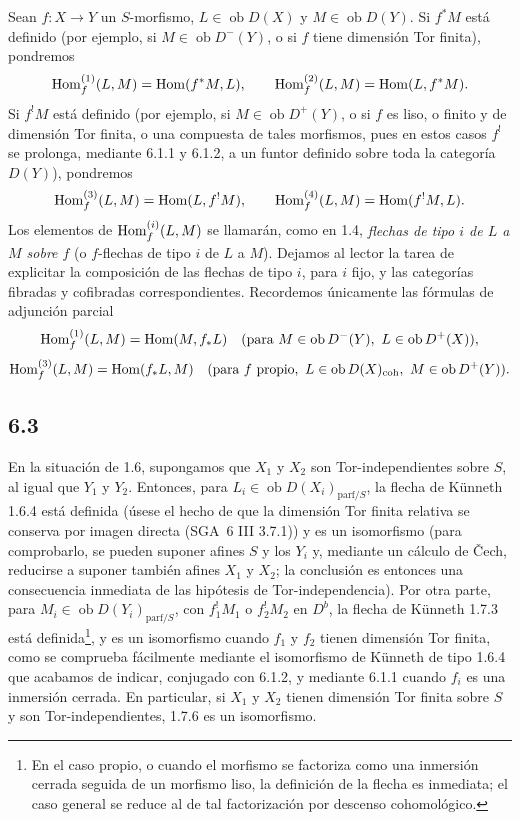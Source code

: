 Sean $f:X\to Y$ un $S$-morfismo, $L\in\operatorname{ob}D(X)$ y $M\in\operatorname{ob}D(Y)$. Si $f^*M$ está definido (por ejemplo, si $M\in\operatorname{ob}D^-(Y)$, o si $f$ tiene dimensión Tor finita), pondremos
\[
\operatorname{Hom}_f^{(1)}(L,M)=\operatorname{Hom}(f^*M,L),\qquad
\operatorname{Hom}_f^{(2)}(L,M)=\operatorname{Hom}(L,f^*M).
\]
Si $f^!M$ está definido (por ejemplo, si $M\in\operatorname{ob}D^+(Y)$, o si $f$ es liso, o finito y de dimensión Tor finita, o una compuesta de tales morfismos, pues en estos casos $f^!$ se prolonga, mediante 6.1.1 y 6.1.2, a un funtor definido sobre toda la categoría $D(Y)$), pondremos
\[
\operatorname{Hom}_f^{(3)}(L,M)=\operatorname{Hom}(L,f^!M),\qquad
\operatorname{Hom}_f^{(4)}(L,M)=\operatorname{Hom}(f^!M,L).
\]
Los elementos de $\operatorname{Hom}_f^{(i)}(L,M)$ se llamarán, como en 1.4, \emph{flechas de tipo $i$ de $L$ a $M$ sobre $f$} (o $f$-flechas de tipo $i$ de $L$ a $M$). Dejamos al lector la tarea de explicitar la composición de las flechas de tipo $i$, para $i$ fijo, y las categorías fibradas y cofibradas correspondientes. Recordemos únicamente las fórmulas de adjunción parcial
\[
\operatorname{Hom}_f^{(1)}(L,M)=\operatorname{Hom}(M,f_*L)\quad(\text{para }M\in\operatorname{ob}D^{-}(Y),\ L\in\operatorname{ob}D^+(X)),
\]
\[
\Hom_f^{(3)}(L,M)=\Hom(f_*L,M)\quad(\text{para }f\text{ propio},\ L\in\operatorname{ob}D(X)_{\mathrm{coh}},\ M\in\operatorname{ob}D^+(Y)).
\]

\subsection*{6.3}
En la situación de 1.6, supongamos que $X_1$ y $X_2$ son Tor-independientes sobre $S$, al igual que $Y_1$ y $Y_2$. Entonces, para $L_i\in\operatorname{ob}D(X_i)_{\mathrm{parf}/S}$, la flecha de Künneth 1.6.4 está definida (úsese el hecho de que la dimensión Tor finita relativa se conserva por imagen directa (SGA~6 III 3.7.1)) y es un isomorfismo (para comprobarlo, se pueden suponer afines $S$ y los $Y_i$ y, mediante un cálculo de Čech, reducirse a suponer también afines $X_1$ y $X_2$; la conclusión es entonces una consecuencia inmediata de las hipótesis de Tor-independencia). Por otra parte, para $M_i\in\operatorname{ob}D(Y_i)_{\mathrm{parf}/S}$, con $f_1^!M_1$ o $f_2^!M_2$ en $D^b$, la flecha de Künneth 1.7.3 está definida\footnote{En el caso propio, o cuando el morfismo se factoriza como una inmersión cerrada seguida de un morfismo liso, la definición de la flecha es inmediata; el caso general se reduce al de tal factorización por descenso cohomológico.}, y es un isomorfismo cuando $f_1$ y $f_2$ tienen dimensión Tor finita, como se comprueba fácilmente mediante el isomorfismo de Künneth de tipo 1.6.4 que acabamos de indicar, conjugado con 6.1.2, y mediante 6.1.1 cuando $f_i$ es una inmersión cerrada. En particular, si $X_1$ y $X_2$ tienen dimensión Tor finita sobre $S$ y son Tor-independientes, 1.7.6 es un isomorfismo.

